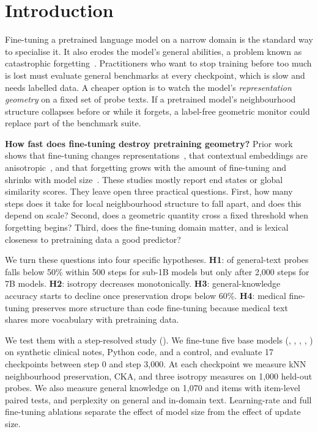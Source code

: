 \section{Introduction}
\label{sec:intro}

Fine-tuning a pretrained language model on a narrow domain is the standard way to specialise it. It also erodes the model's general abilities, a problem known as catastrophic forgetting~\citep{mccloskey1989catastrophic,luo2023empirical}. Practitioners who want to stop training before too much is lost must evaluate general benchmarks at every checkpoint, which is slow and needs labelled data. A cheaper option is to watch the model's \emph{representation geometry} on a fixed set of probe texts. If a pretrained model's neighbourhood structure collapses before or while it forgets, a label-free geometric monitor could replace part of the benchmark suite.

{\bf How fast does fine-tuning destroy pretraining geometry?} Prior work shows that fine-tuning changes representations~\citep{merchant2020happens}, that contextual embeddings are anisotropic~\citep{ethayarajh2019contextual,mu2018allbutthetop}, and that forgetting grows with the amount of fine-tuning and shrinks with model size~\citep{kalajdzievski2024scaling,biderman2024lora}. These studies mostly report end states or global similarity scores. They leave open three practical questions. First, how many steps does it take for local neighbourhood structure to fall apart, and does this depend on scale? Second, does a geometric quantity cross a fixed threshold when forgetting begins? Third, does the fine-tuning domain matter, and is lexical closeness to pretraining data a good predictor?

We turn these questions into four specific hypotheses. \textbf{H1}: \pres of general-text probes falls below 50\% within 500 steps for sub-1B models but only after 2,000 steps for 7B models. \textbf{H2}: isotropy decreases monotonically. \textbf{H3}: general-knowledge accuracy starts to decline once preservation drops below 60\%. \textbf{H4}: medical fine-tuning preserves more structure than code fine-tuning because medical text shares more vocabulary with pretraining data.

We test them with a step-resolved study (). We fine-tune five base models (\pythiaS, \pythiaM, \qwenS, \qwenM, \qwenL) on synthetic clinical notes, Python code, and a \wikitext control, and evaluate 17 checkpoints between step 0 and step 3,000. At each checkpoint we measure kNN neighbourhood preservation, CKA, and three isotropy measures on 1,000 held-out probes. We also measure general knowledge on 1,070 \mmlu and \arce items with item-level paired tests, and perplexity on general and in-domain text. Learning-rate and full fine-tuning ablations separate the effect of model size from the effect of update size.

